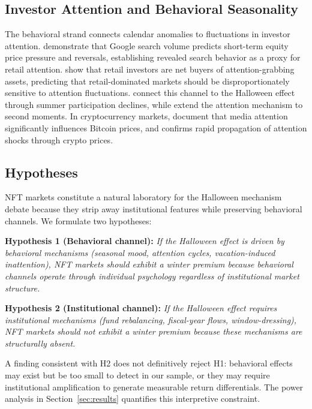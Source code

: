 \documentclass[12pt,a4paper]{article}
\begin{document}
\subsection{Investor Attention and Behavioral Seasonality}

The behavioral strand connects calendar anomalies to fluctuations in investor attention. \citet{DaEngelbergGao2011} demonstrate that Google search volume predicts short-term equity price pressure and reversals, establishing revealed search behavior as a proxy for retail attention. \citet{BarberOdean2008} show that retail investors are net buyers of attention-grabbing assets, predicting that retail-dominated markets should be disproportionately sensitive to attention fluctuations. \citet{HongYu2009} connect this channel to the Halloween effect through summer participation declines, while \citet{DimpflJank2016} extend the attention mechanism to second moments. In cryptocurrency markets, \citet{PhilippasRjiba2019} document that media attention significantly influences Bitcoin prices, and \citet{Ante2023} confirms rapid propagation of attention shocks through crypto prices.

\subsection{Hypotheses}

NFT markets constitute a natural laboratory for the Halloween mechanism debate because they strip away institutional features while preserving behavioral channels. We formulate two hypotheses:

\medskip
\noindent\textbf{Hypothesis 1 (Behavioral channel):} \textit{If the Halloween effect is driven by behavioral mechanisms (seasonal mood, attention cycles, vacation-induced inattention), NFT markets should exhibit a winter premium because behavioral channels operate through individual psychology regardless of institutional market structure.}

\medskip
\noindent\textbf{Hypothesis 2 (Institutional channel):} \textit{If the Halloween effect requires institutional mechanisms (fund rebalancing, fiscal-year flows, window-dressing), NFT markets should not exhibit a winter premium because these mechanisms are structurally absent.}

\medskip
\noindent A finding consistent with H2 does not definitively reject H1: behavioral effects may exist but be too small to detect in our sample, or they may require institutional amplification to generate measurable return differentials. The power analysis in Section~\ref{sec:results} quantifies this interpretive constraint.
\end{document}
